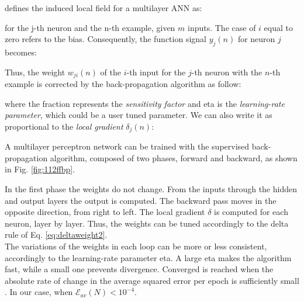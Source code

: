 \citet {RefWorks:158} defines the induced local field for a multilayer
\acs{ANN} as:

for the j-th neuron and the n-th example, given $m$ inputs.
The case of $i$ equal to zero refers to the bias.
Consequently, the function signal $y_j(n)$ for neuron $j$ becomes: 

Thus, the weight $w_{ji}(n)$ of the $i$-th input for the $j$-th neuron
with the $n$-th example is corrected by the back-propagation algorithm as
follow:

where the fraction represents the \textit{sensitivity factor} and \acs{eta} is
the \textit{learning-rate parameter}, which could be a user tuned parameter.
We can also write it as proportional to the \textit{local gradient}
$\delta_j(n)$:

A multilayer perceptron network can be trained with the
supervised back-propagation algorithm, composed of two phases, forward and
backward, as shown in Fig. \ref{fig:112ffbp}.

In the first phase the weights do not change. 
From the inputs through the hidden
and output layers the output is computed.
The backward pass moves in the opposite direction, from right to left.
The local gradient $\delta$ is computed for each neuron, layer by layer.
Thus, the weights can be tuned accordingly to the delta rule of Eq.
\ref{eq:deltaweight2}.\\
The variations of the weights in each loop can be more or less consistent,
accordingly to the learning-rate parameter \acs{eta}. 
A large \acs{eta} makes the algorithm fast,
while a small one prevents divergence.
Converged is reached when the absolute rate of change in the average squared
error per epoch is sufficiently small \cite {RefWorks:158}.
In our case, when $\mathscr{E}_{av}(N) < 10^{-4}$.\\

% 

